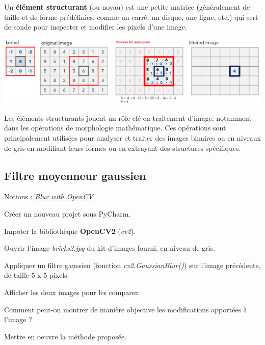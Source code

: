 \documentclass[a4paper,11pt,titlepage]{article} %
\begin{document}
Un \textbf{élément structurant} (ou noyau) est une petite matrice (généralement de taille et de forme prédéfinies, comme un carré, un disque, une ligne, etc.) qui sert de sonde pour inspecter et modifier les pixels d'une image.  

\begin{center}
	\includegraphics[width=\textwidth]{images/kernel.png}
\end{center}

Les éléments structurants jouent un rôle clé en traitement d'image, notamment dans les opérations de morphologie mathématique. Ces opérations sont principalement utilisées pour analyser et traiter des images binaires ou en niveaux de gris en modifiant leurs formes ou en extrayant des structures spécifiques.


\subsection{Filtre moyenneur gaussien}

\begin{mdframed}[style=sidebar,frametitle={}]
Notions : \href{https://iogs-lense-training.github.io/image-processing/contents/opencv_blur.html#blur-with-opencv
}{\textit{Blur with OpenCV}}
\end{mdframed}

\Manip Créer un nouveau projet sous PyCharm.

\Manip Impoter la bibliothèque \textbf{OpenCV2} (\textit{cv2}).

\Manip Ouvrir l'image \textsl{bricks2.jpg} du kit d'images fourni, en niveau de gris.

\Manip Appliquer un filtre gaussien (fonction \textsl{cv2.GaussianBlur()}) sur l'image précédente, de taille 5 x 5 pixels.

\Manip Afficher les deux images pour les comparer.

\Quest Comment peut-on montrer de manière objective les modifications apportées à l'image ? 

\Manip Mettre en oeuvre la méthode proposée.

\medskip
\end{document}

